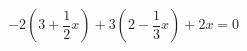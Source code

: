 \begin{ex}[type=equation]
	\begin{condition}
		$-2\left(3+\dfrac{1}{2}x\right)+3\left(2-\dfrac{1}{3}x\right) + 2x = 0$
	\end{condition}
	\answer{$(-\infty;\infty)$}
\end{ex}